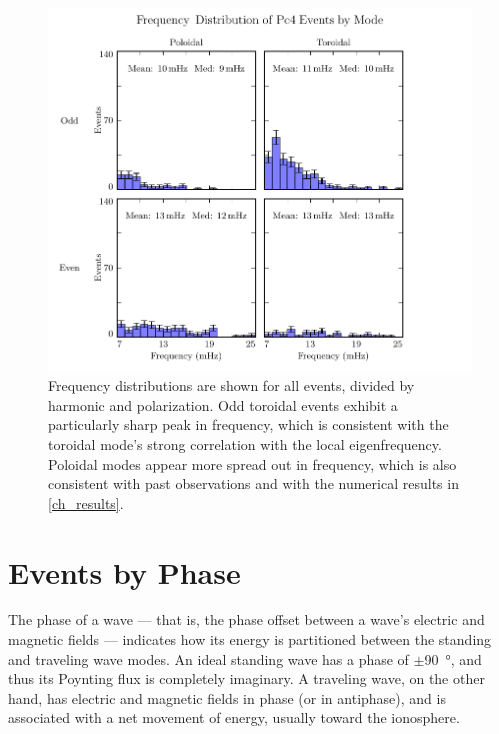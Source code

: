 \begin{figure}[!htb]
  \centering
  \includegraphics[width=\textwidth]{figures/f.pdf}
  \caption[Frequency Distribution of Pc4 Events by Mode]{
    Frequency distributions are shown for all events, divided by harmonic and
    polarization. Odd toroidal events exhibit a particularly sharp peak in
    frequency, which is consistent with the toroidal mode's strong correlation
    with the local eigenfrequency. Poloidal modes appear more spread out in
    frequency, which is also consistent with past observations and with the
    numerical results in \cref{ch_results}. 
  }
  \label{fig_f}
\end{figure}


\section{Events by Phase}
  \label{sec_phase}

The phase of a wave --- that is, the phase offset between a wave's electric and
magnetic fields --- indicates how its energy is partitioned between the
standing and traveling wave modes. An ideal standing wave has a phase of
$\pm$\SI{90}{\degree}, and thus its Poynting flux is completely imaginary. A
traveling wave, on the other hand, has electric and magnetic fields in phase
(or in antiphase), and is associated with a net movement of energy, usually
toward the ionosphere. 

